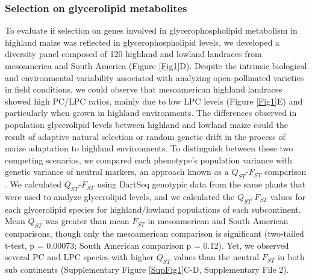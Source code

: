 \documentclass[9pt,twocolumn,twoside]{BioRxiv}
\begin{document}
\subsubsection{Selection on glycerolipid metabolites} 
To evaluate if selection on genes involved in glycerophospholipid metabolism in highland maize was reflected in glycerophospholipid levels, we developed a diversity panel composed of 120 highland and lowland landraces from mesoamerica and South America (Figure \ref{Fig1}D). 
Despite the intrinsic biological and environmental variability associated with analyzing open-pollinated varieties in field conditions, we could observe that mesoamerican highland landraces showed  high PC/LPC ratios, mainly due to low LPC levels (Figure \ref{Fig1}E) and particularly when grown in highland environments. 
The differences observed in population glycerolipid levels between highland and lowland maize could the result of adaptive natural selection or random genetic drift in the process of maize adaptation to highland environments.
To distinguish between these two competing scenarios, we compared each phenotype's population variance with genetic variance of neutral markers, an approach known as a $Q_{ST}$-$F_{ST}$ comparison \cite{Leinonen2013-ic}.
We calculated $Q_{ST}$-$F_{ST}$ using DartSeq genotypic data from the same plants that were used to analyze glycerolipid levels, and we calculated the $Q_{ST}$-$F_{ST}$ values for each glycerolipid species for highland/lowland populations of each subcontinent. 
Mean $Q_{ST}$ was greater than mean $F_{ST}$ in mesoamerican and South American comparisons, though only the mesoamerican comparison is significant (two-tailed t-test, p = 0.00073; South American comparison p = 0.12).
Yet, we observed several PC and LPC species with higher $Q_{ST}$ values than the neutral $F_{ST}$ in both sub continents (Supplementary Figure \ref{SupFig1}C-D, Supplementary File 2).
\end{document}
